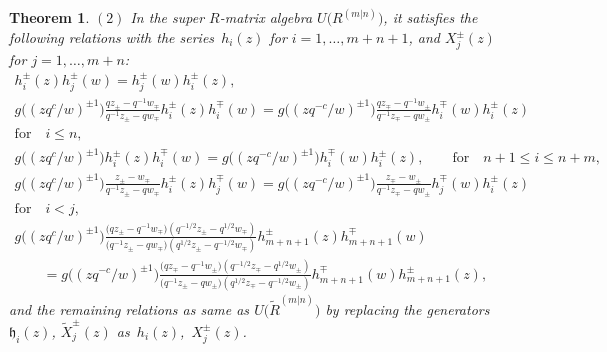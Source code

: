 \documentclass[pdftex]{sigma}
\numberwithin{equation}{section}
\newtheorem{Theorem}{Theorem}[section]
\begin{document}
\begin{Theorem}
$(2)$ In the super $R$-matrix algebra $U\bigl(R^{(m|n)}\bigr)$, it satisfies the following relations with the series~$h_i(z)$ for $i=1,\dots,m+n+1$, and $X_j^{\pm}(z)$ for $j=1,\dots,m+n$:
\begin{gather*}%
 h_i^{\pm}(z)h_j^{\pm}(w)=h_j^{\pm}(w)h_i^{\pm}(z), \\
 g\bigl((zq^c/w)^{\pm1}\bigr)\frac{qz_{\pm}-q^{-1}w_{\mp}}{q^{-1}z_{\pm}-qw_{\mp}}h_i^{\pm}(z)h_i^{\mp}(w)
 =g\bigl((zq^{-c}/w)^{\pm1}\bigr)\frac{qz_{\mp}-q^{-1}w_{\pm}}{q^{-1}z_{\mp}-qw_{\pm}}h_i^{\mp}(w)h_i^{\pm}(z)\\
 \text{for} \quad
 i\leq n,\\
 g\bigl((zq^{c}/w)^{\pm1}\bigr) h_i^{\pm}(z)h_i^{\mp}(w)=g\bigl((zq^{-c}/w)^{\pm1}\bigr)h_i^{\mp}(w)h_i^{\pm}(z), \qquad\textrm{for}\quad n+1\leq i\leq n+m,\\
 g\bigl((zq^{c}/w)^{\pm1}\bigr)\frac{z_{\pm}-w_{\mp}}{q^{-1}z_{\pm}-qw_{\mp}}h_i^{\pm}(z)h_j^{\mp}(w)=g\bigl((zq^{-c}/w)^{\pm1}\bigr)
 \frac{z_{\mp}-w_{\pm}}{q^{-1}z_{\mp}-qw_{\pm}}h_j^{\mp}(w)h_i^{\pm}(z)\\
 \text{for} \quad
 i<j,
\\
 g\bigl((zq^{c}/w)^{\pm1}\bigr)\frac{\bigl(qz_{\pm}-q^{-1}w_{\mp}\bigr)(q^{-1/2}z_{\pm}-q^{1/2}w_{\mp})}{\bigl(q^{-1}z_{\pm}-qw_{\mp}\bigr)
 (q^{1/2}z_{\pm}-q^{-1/2}w_{\mp})}h_{m+n+1}^{\pm}(z)h_{m+n+1}^{\mp}(w)\\
 \qquad=g\bigl((zq^{-c}/w)^{\pm1}\bigr)\frac{\bigl(qz_{\mp}-q^{-1}w_{\pm}\bigr)(q^{-1/2}z_{\mp}-q^{1/2}w_{\pm})}{\bigl(q^{-1}z_{\pm}-qw_{\pm}\bigr)
 (q^{1/2}z_{\mp}-q^{-1/2}w_{\pm})}h_{m+n+1}^{\mp}(w)h_{m+n+1}^{\pm}(z),
\end{gather*}
and the remaining relations as same as $U\bigl(\widetilde{R}^{(m|n)}\bigr)$ by replacing the generators $\mathfrak{h}_i(z)$, $\widetilde{X}_j^{\pm}(z)$ as~$h_i(z)$,~$X_j^{\pm}(z)$.
\end{Theorem}
\end{document}
